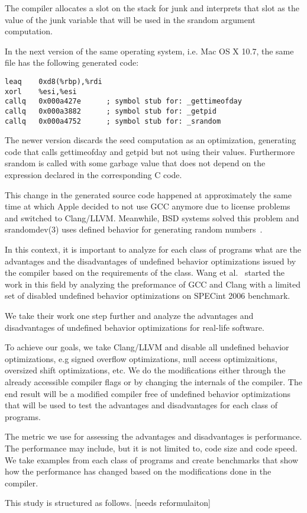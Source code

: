 The compiler allocates a slot on the stack for junk and interprets that
slot as the value of the junk variable that will be used in the srandom
argument computation. 

In the next version of the same operating system, i.e. Mac OS X 10.7,
the same file has the following generated code:
\begin{lstlisting}[style=Cstyle, caption={}, label={lst:junk}]
leaq    0xd8(%rbp),%rdi
xorl    %esi,%esi
callq   0x000a427e      ; symbol stub for: _gettimeofday
callq   0x000a3882      ; symbol stub for: _getpid
callq   0x000a4752      ; symbol stub for: _srandom
\end{lstlisting}

The newer version discards the seed computation as an optimization,
generating code that calls gettimeofday and getpid but not using their
values. Furthermore srandom is called with some garbage value that does
not depend on the expression declared in the corresponding C code.

This change in the generated source code happened at approximately the
same time at which Apple decided to not use GCC anymore due to license
problems and switched to Clang/LLVM. Meanwhile, BSD systems solved this
problem and srandomdev(3) uses defined behavior for generating random
numbers~\cite{junkobsd,junkfbsd,junkdbsd}.

In this context, it is important to analyze for each class of programs
what are the advantages and the disadvantages of undefined behavior
optimizations issued by the compiler based on the requirements of the
class. Wang et al.~\cite{wang2012undefined} started the work in this
field by analyzing the preformance of GCC and Clang with a limited set
of disabled undefined behavior optimizations on SPECint 2006 benchmark.

We take their work one step further and analyze the advantages and
disadvantages of undefined behavior optimizations for real-life
software.

To achieve our goals, we take Clang/LLVM and disable all undefined
behavior optimizations, e.g signed overflow optimizations, null access
optimizaitions, oversized shift optimizations, etc. We do the
modifications either through the already accessible compiler flags
or by changing the internals of the compiler. The end result will be a
modified compiler free of undefined behavior optimizations that will be
used to test the advantages and disadvantages for each class of
programs.

The metric we use for assessing the advantages and disadvantages is
performance. The performance may include, but it is not limited to, code
size and code speed. We take examples from each class of programs and
create benchmarks that show how the performance has changed based on the
modifications done in the compiler.

This study is structured as follows. [needs reformulaiton]
